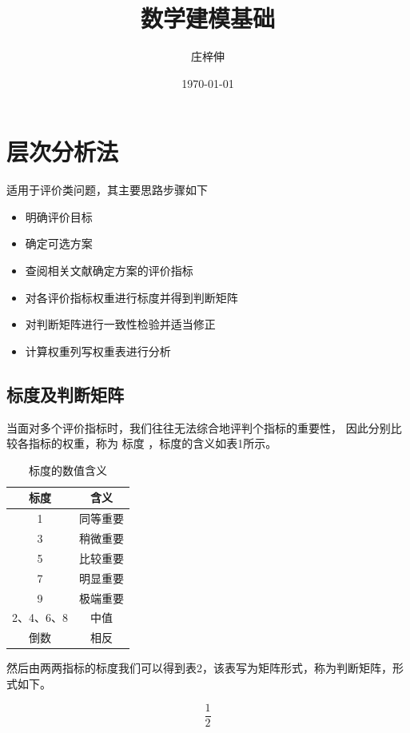 \documentclass[UTF8]{article} %
\title{\heiti 数学建模基础}
\author{\kaishu 庄梓伸}
\date{\kaishu \today}
\begin{document}
\maketitle

\section{层次分析法}

适用于评价类问题，其主要思路步骤如下
\begin{itemize}
    \item 明确评价目标
    \item 确定可选方案
    \item 查阅相关文献确定方案的评价指标
    \item 对各评价指标权重进行标度并得到判断矩阵
    \item 对判断矩阵进行一致性检验并适当修正
    \item 计算权重列写权重表进行分析
\end{itemize}

\subsection{标度及判断矩阵}

当面对多个评价指标时，我们往往无法综合地评判个指标的重要性，
因此分别比较各指标的权重，称为 标度 ，标度的含义如表1所示。

\begin{table}[ht]
    \centering
    \begin{tabular}{|c|c|}
        \hline
        标度 & 含义 \\
        \hline
        1 & 同等重要\\
        \hline
        3 & 稍微重要\\
        \hline
        5 & 比较重要\\
        \hline
        7 & 明显重要\\
        \hline
        9 & 极端重要\\
        \hline
        2、4、6、8 & 中值\\
        \hline
        倒数 & 相反\\
        \hline
    \end{tabular}
    \caption{标度的数值含义}
    \label{tab:table}
\end{table}

然后由两两指标的标度我们可以得到表2，该表写为矩阵形式，称为判断矩阵，形式如下。

\begin{equation}
    \frac{1}{2}
\end{equation}
\end{document}
